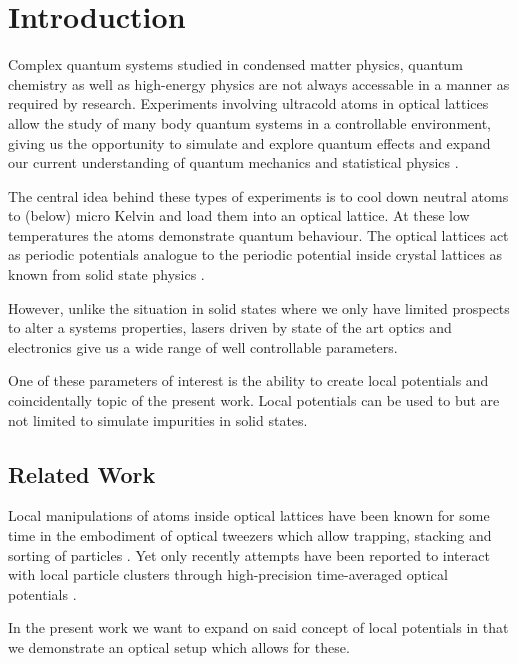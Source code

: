 \chapter{Introduction}

Complex quantum systems studied in condensed matter physics, quantum chemistry
as well as high-energy physics are not always accessable in a manner as
required by research. Experiments involving ultracold atoms in optical
lattices allow the study of many body quantum systems in a controllable
environment, giving us the opportunity to simulate and explore quantum
effects and expand our current understanding of quantum mechanics and
statistical physics \cite{Gross2017}.

The central idea behind these types of experiments is to cool down neutral
atoms to (below) micro Kelvin and load them into an optical lattice. At these
low temperatures the atoms demonstrate quantum behaviour. The optical lattices
act as periodic potentials analogue to the periodic potential inside crystal
lattices as known from solid state physics \cite{Lewenstein2007}.

However, unlike the situation in solid states where we only have limited
prospects to alter a systems properties, lasers driven by state of the art
optics and electronics give us a wide range of well controllable parameters.

One of these parameters of interest is the ability to create local potentials
and coincidentally topic of the present work. Local potentials can be used to
but are not limited to simulate impurities in solid states.

\section{Related Work}


Local manipulations of atoms inside optical lattices have been known for some
time in the embodiment of optical tweezers which allow trapping, stacking and
sorting of particles \cite{Tadmor2014}. Yet only recently attempts have been
reported to interact with local particle clusters through high-precision
time-averaged optical potentials \cite{Roy2016}.

In the present work we want to expand on said concept of local potentials in
that we demonstrate an optical setup which allows for these.
